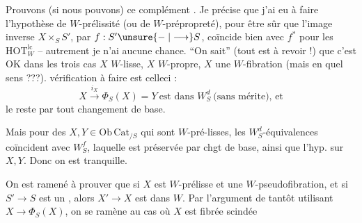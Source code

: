 Prouvons (si nous pouvons) ce complément . Je précise que j'ai eu à faire l'hypothèse de $W$-prélissité  (ou de $W$-prépropreté), pour être
sûr que l'image inverse $X\times_S S'$, par $f:S'\unsure{\relbar|\longrightarrow}S$, coïncide bien avec $f^*$ pour les $\mathrm{HOT}_W^{\mathrm{lc}}$ -- autrement je n'ai aucune chance. ``On sait'' (tout est à revoir !) que c'est OK
dans les trois cas $X$ $W$-lisse, $X$ $W$-propre, $X$ une $W$-fibration (mais en quel sens ???).  vérification à faire  est celle\unsure{-| }ci :
\[
X\overset{i_X}{\longrightarrow}\Phi_S(X)=Y\ \text{est dans }W_S^d\ \text{(sans mérite), et}\tag*{(*)}
\]
le reste par tout changement de base.

Mais pour des $X,Y\in\mathrm{Ob}\,\mathrm{Cat}_{/S}$ qui sont $W$-pré-lisses, les $W_S^d$-équivalences coïncident avec $W_S^f$, laquelle est préservée par chgt de base, ainsi que l'hyp. sur $X,Y$. Donc on est tranquille.

On est ramené à prouver que si $X$ est $W$-prélisse   et une $W$-pseudofibration,  et si $S'\longrightarrow S$ est un , alors $X'\longrightarrow X$ est dans $W$. Par l'argument de  tantôt utilisant $X\longrightarrow\Phi_S(X)$, on se ramène au cas où $X$ est fibrée scindée
